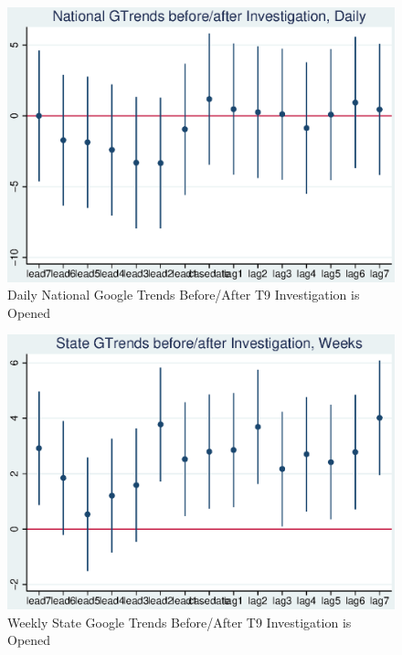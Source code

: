 \documentclass[AER,draftmode]{AEA}
\begin{document}
\begin{figure}
\includegraphics[]{figures/national_trend_cases.eps}

\caption{Daily National Google Trends Before/After T9 Investigation is Opened}
\end{figure}

\begin{figure}
\includegraphics[]{figures/state_trend_cases.eps}

\caption{Weekly State Google Trends Before/After T9 Investigation is Opened}

\end{figure}
\end{document}
